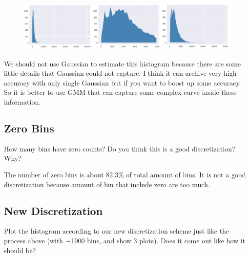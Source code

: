 \documentclass[12pt]{article}
\begin{document}
\begin{figure}[H]
  \centering
  \includegraphics[width=1\textwidth]{cdn_before.png}
  \end{figure}

We should not use Gaussian to estimate this histogram because there are some little details that
Gaussian could not capture. I think it can archive very high accuracy with only single Gaussian but if you want to boost up some accuracy. 
So it is better to use GMM that can capture some complex curve inside these information.

\subsection{Zero Bins}
How many bins have zero counts? Do you think this is a good discretization?
Why?

\begin{figure}[H]
  \noindent{}
  \end{figure}

The number of zero bins is about 82.3\% of total amount of bins. It is not a good discretization
because amount of bin that include zero are too much.

\subsection{New Discretization}

Plot the histogram according to our new discretization scheme just like the
process above (with ∼1000 bins, and show 3 plots). Does it come out like how
it should be?
\end{document}
